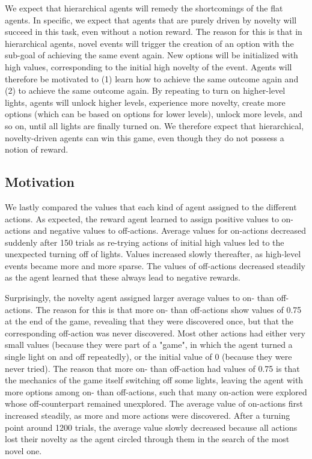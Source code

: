 \documentclass{article}
\begin{document}
We expect that hierarchical agents will remedy the shortcomings of the flat agents. In specific, we expect that agents that are purely driven by novelty will succeed in this task, even without a notion reward. The reason for this is that in hierarchical agents, novel events will trigger the creation of an option with the sub-goal of achieving the same event again. New options will be initialized with high values, corresponding to the initial high novelty of the event. Agents will therefore be motivated to (1) learn how to achieve the same outcome again and (2) to achieve the same outcome again. By repeating to turn on higher-level lights, agents will unlock higher levels, experience more novelty, create more options (which can be based on options for lower levels), unlock more levels, and so on, until all lights are finally turned on. We therefore expect that hierarchical, novelty-driven agents can win this game, even though they do not possess a notion of reward.


\subsection{Motivation}

We lastly compared the values that each kind of agent assigned to the different actions. As expected, the reward agent learned to assign positive values to on-actions and negative values to off-actions. Average values for on-actions decreased suddenly after 150 trials as re-trying actions of initial high values led to the unexpected turning off of lights. Values increased slowly thereafter, as high-level events became more and more sparse. The values of off-actions decreased steadily as the agent learned that these always lead to negative rewards.

Surprisingly, the novelty agent assigned larger average values to on- than off-actions. The reason for this is that more on- than off-actions show values of 0.75 at the end of the game, revealing that they were discovered once, but that the corresponding off-action was never discovered. Most other actions had either very small values (because they were part of a "game", in which the agent turned a single light on and off repeatedly), or the initial value of 0 (because they were never tried). The reason that more on- than off-action had values of 0.75 is that the mechanics of the game itself switching off some lights, leaving the agent with more options among on- than off-actions, such that many on-action were explored whose off-counterpart remained unexplored. The average value of on-actions first increased steadily, as more and more actions were discovered. After a turning point around 1200 trials, the average value slowly decreased because all actions lost their novelty as the agent circled through them in the search of the most novel one.
\end{document}
